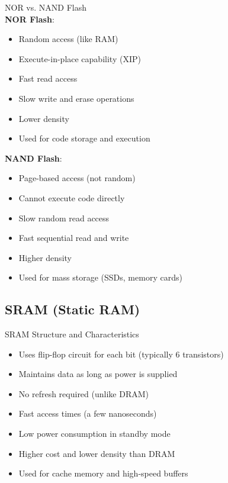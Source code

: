 \begin{definition}{NOR vs. NAND Flash}\\
\textbf{NOR Flash}:
\begin{itemize}
    \item Random access (like RAM)
    \item Execute-in-place capability (XIP)
    \item Fast read access
    \item Slow write and erase operations
    \item Lower density
    \item Used for code storage and execution
\end{itemize}
\textbf{NAND Flash}:
\begin{itemize}
    \item Page-based access (not random)
    \item Cannot execute code directly
    \item Slow random read access
    \item Fast sequential read and write
    \item Higher density
    \item Used for mass storage (SSDs, memory cards)
\end{itemize}
\end{definition}

\multend

\subsection{SRAM (Static RAM)}


\begin{concept}{SRAM Structure and Characteristics}
\begin{itemize}
    \item Uses flip-flop circuit for each bit (typically 6 transistors)
    \item Maintains data as long as power is supplied
    \item No refresh required (unlike DRAM)
    \item Fast access times (a few nanoseconds)
    \item Low power consumption in standby mode
    \item Higher cost and lower density than DRAM
    \item Used for cache memory and high-speed buffers
\end{itemize}
\end{concept}

